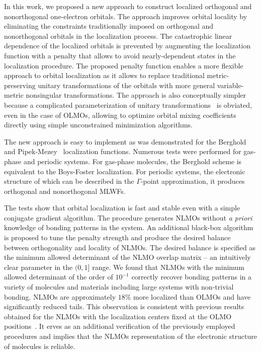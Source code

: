\documentclass[aps,prl,reprint,amsmath,amssymb]{revtex4-1}
\begin{document}
In this work, we proposed a new approach to construct localized orthogonal and nonorthogonal one-electron orbitals. 
The approach improves orbital locality by eliminating the constraints traditionally imposed on orthogonal and nonorthogonal orbitals in the localization process. The catastrophic linear dependence of the localized orbitals is prevented by augmenting the localization function with a penalty that allows to avoid nearly-dependent states in the localization procedure.
%
The proposed penalty function enables a more flexible approach to orbital localization as it allows to replace traditional metric-preserving unitary transformations of the orbitals with more general variable-metric nonsingular transformations. The approach is also conceptually simpler because a complicated parameterization of unitary transformations~\cite{hoyvik2017generalising} is obviated, even in the case of OLMOs, allowing to optimize orbital mixing coefficients directly using simple unconstrained minimization algorithms. 

The new approach is easy to implement as was demonstrated for the Berghold~\cite{berghold2000general} and Pipek-Mezey~\cite{pipek1989fast} localization functions. 
Numerous tests were performed for gas-phase and periodic systems. For gas-phase molecules, the Berghold scheme is equivalent to the Boys-Foster localization. 
For periodic systems, the electronic structure of which can be described in the $\Gamma$-point approximation, it produces orthogonal and nonorthogonal MLWFs. 

The tests show that orbital localization is fast and stable even with a simple conjugate gradient algorithm. The procedure generates NLMOs without \emph{a priori} knowledge of bonding patterns in the system. 
An additional black-box algorithm is proposed to tune the penalty strength and produce the desired balance between orthogonality and locality of NLMOs. The desired balance is specified as the minimum allowed determinant of the NLMO overlap matrix -- an intuitively clear parameter in the $(0,1]$ range. 
We found that NLMOs with the minimum allowed determinant of the order of $10^{-1}$ correctly recover bonding patterns in a variety of molecules and materials including large systems with non-trivial bonding. NLMOs are approximately $18\%$ more localized than OLMOs and have significantly reduced tails.
This observation is consistent with previous results obtained for the NLMOs with the localization centers fixed at the OLMO positions~\cite{feng2004An_efficient, cui2010efficient}. It erves as an additional verification of the previously employed procedures and implies that the NLMOs representation of the electronic structure of molecules is reliable. 
\end{document}
